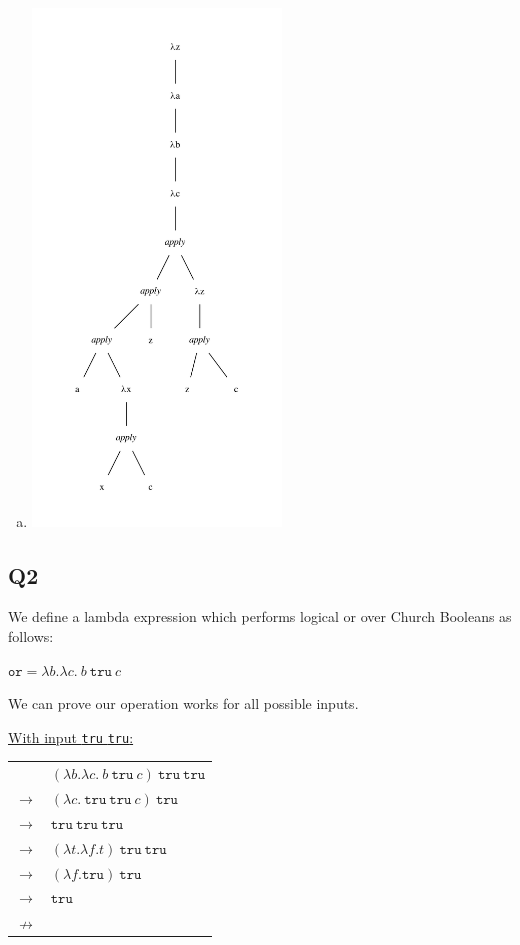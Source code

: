 \documentclass[12pt, fleqn]{article}
\begin{document}
\begin{enumerate}[(a)]
    \item
    \begin{center}
        \includegraphics[width=0.52\textwidth]{c1.pdf}
    \end{center} 

\end{enumerate}

\subsection{Q2}
We define a lambda expression which performs logical or over Church Booleans as follows:
\begin{center}
    $\texttt{or} = \lambda b. \lambda c.\:b\:\texttt{tru}\:c$
\end{center}
We can prove our operation works for all possible inputs.

\medskip

\underline{With input \texttt{tru} \texttt{tru}:}
\begin{center}
    \begin{tabular}{c l}
    & $(\lambda b. \lambda c.\:b\:\texttt{tru}\:c)\:\texttt{tru}\:\texttt{tru}$ \\ 
    $\rightarrow$ & $(\lambda c.\:\texttt{tru}\:\texttt{tru}\:c)\:\texttt{tru}$ \\
    $\rightarrow$ & $\texttt{tru}\:\texttt{tru}\:\texttt{tru}$ \\
    $\rightarrow$ & $(\lambda t. \lambda f. t)\:\texttt{tru}\:\texttt{tru}$ \\
    $\rightarrow$ & $(\lambda f. \texttt{tru})\:\texttt{tru}$ \\
    $\rightarrow$ & $\texttt{tru}$ \\
    $\nrightarrow$ & \\
    \end{tabular}
\end{center}
    
\end{document}
